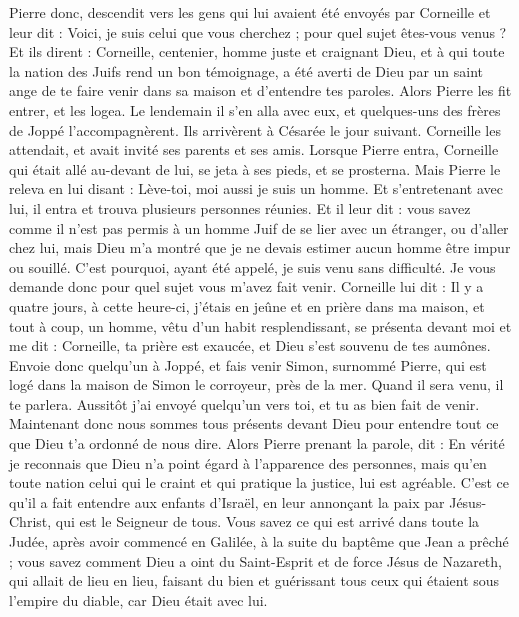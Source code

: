 \begin{multicols}{2}
Pierre donc, descendit vers les gens qui lui avaient été envoyés par Corneille et leur dit : Voici, je suis celui que vous cherchez ; pour quel sujet êtes-vous venus ?
Et ils dirent : Corneille, centenier, homme juste et craignant Dieu, et à qui toute la nation des Juifs rend un bon témoignage, a été averti de Dieu par un saint ange de te faire venir dans sa maison et d'entendre tes paroles.
Alors Pierre les fit entrer, et les logea. Le lendemain il s'en alla avec eux, et quelques-uns des frères de Joppé l'accompagnèrent.
Ils arrivèrent à Césarée le jour suivant. Corneille les attendait, et avait invité ses parents et ses amis.
Lorsque Pierre entra, Corneille qui était allé au-devant de lui, se jeta à ses pieds, et se prosterna.
Mais Pierre le releva en lui disant : Lève-toi, moi aussi je suis un homme.
Et s'entretenant avec lui, il entra et trouva plusieurs personnes réunies.
Et il leur dit : vous savez comme il n'est pas permis à un homme Juif de se lier avec un étranger, ou d'aller chez lui, mais Dieu m'a montré que je ne devais estimer aucun homme être impur ou souillé.
C'est pourquoi, ayant été appelé, je suis venu sans difficulté. Je vous demande donc pour quel sujet vous m'avez fait venir.
Corneille lui dit : Il y a quatre jours, à cette heure-ci, j'étais en jeûne et en prière dans ma maison, et tout à coup, un homme, vêtu d'un habit resplendissant, se présenta devant moi et me dit :
Corneille, ta prière est exaucée, et Dieu s'est souvenu de tes aumônes.
Envoie donc quelqu'un à Joppé, et fais venir Simon, surnommé Pierre, qui est logé dans la maison de Simon le corroyeur, près de la mer. Quand il sera venu, il te parlera.
Aussitôt j'ai envoyé quelqu'un vers toi, et tu as bien fait de venir. Maintenant donc nous sommes tous présents devant Dieu pour entendre tout ce que Dieu t'a ordonné de nous dire.
Alors Pierre prenant la parole, dit : En vérité je reconnais que Dieu n'a point égard à l'apparence des personnes,
mais qu'en toute nation celui qui le craint et qui pratique la justice, lui est agréable.
C'est ce qu'il a fait entendre aux enfants d'Israël, en leur annonçant la paix par Jésus-Christ, qui est le Seigneur de tous.
Vous savez ce qui est arrivé dans toute la Judée, après avoir commencé en Galilée, à la suite du baptême que Jean a prêché ;
vous savez comment Dieu a oint du Saint-Esprit et de force Jésus de Nazareth, qui allait de lieu en lieu, faisant du bien et guérissant tous ceux qui étaient sous l'empire du diable, car Dieu était avec lui.

\end{multicols}
